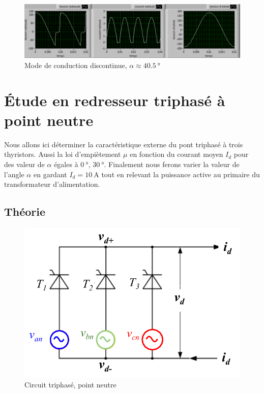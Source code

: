 \documentclass[a4paper, 11pt, openany, oneside, french]{article}
\begin{document}
\begin{figure}[!ht]
    \centering
    \includegraphics[width=\linewidth]{red_1_1}
    \caption{Mode de conduction discontinue, $\alpha \approx \SI{40.5}{\degree}$}
    \label{fig:dcm_msr}
\end{figure}

\clearpage
\section{Étude en redresseur triphasé à point neutre}
Nous allons ici déterminer la caractéristique externe du pont triphasé à trois thyristors. Aussi la loi d'empiètement $\mu$ en fonction du courant moyen $I_d$ pour des valeur de $\alpha$ égales à $\SI{0}{\degree}$, $\SI{30}{\degree}$. Finalement nous ferons varier la valeur de l'angle $\alpha$ en gardant $I_d=\SI{10}{\ampere}$ tout en relevant la puissance active au primaire du transformateur d'alimentation.

\subsection{Théorie \label{subsec:th2}}

\begin{figure}[!ht]
    \centering
    \includegraphics[width=0.8\linewidth]{cir_tripha}
    \caption{Circuit triphasé, point neutre}
    \label{fig:cir_tripha}
\end{figure}
\end{document}
